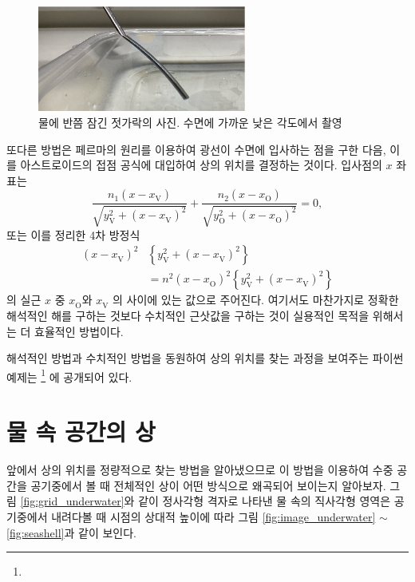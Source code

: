 \documentclass[twocolumn]{article}
\begin{document}
\begin{figure}[h]
	\centering
	\includegraphics[width=2.7in]{figs/img_1805_2.eps}
	\caption{물에 반쯤 잠긴 젓가락의 사진. 수면에 가까운 낮은 각도에서 촬영}
	\label{fig:picture}
\end{figure}


또다른 방법은 페르마의 원리를 이용하여 광선이 수면에 입사하는 점을 구한 다음, 이를 아스트로이드의 접점 공식에 대입하여 상의 위치를 결정하는 것이다.
입사점의 $x$ 좌표는
\[
\dfrac{n_1 \left( x - x_{\mathrm{V}}^{} \right)}{\sqrt{ y_{\mathrm{V}}^2 + \left( x - x_{\mathrm{V}}^{} \right)^2 }}
+\dfrac{n_2 \left( x - x_{\mathrm{O}}^{} \right)}{\sqrt{ y_{\mathrm{O}}^2 + \left( x - x_{\mathrm{O}}^{} \right)^2 }}
= 0,
\]
또는 이를 정리한 4차 방정식
\[ \begin{aligned}
\left( x - x_{\mathrm{V}}^{} \right)^2 & \left\{ y_{\mathrm{V}}^2 + \left(x - x_{\mathrm{V}}^{} \right)^2 \right\}\\
&= n^2 \left( x - x_{\mathrm{O}}^{} \right)^2 \left\{ y_{\mathrm{V}}^2 + \left(x - x_{\mathrm{V}}^{} \right)^2 \right\}
\end{aligned}
\]
의 실근 $x$ 중 $x_{\mathrm{O}}^{}$와 $x_{\mathrm{V}}^{}$ 의 사이에 있는 값으로 주어진다. 여기서도 마찬가지로 정확한 해석적인 해를 구하는 것보다 수치적인 근삿값을 구하는 것이 실용적인 목적을 위해서는 더 효율적인 방법이다.

해석적인 방법과 수치적인 방법을 동원하여 상의 위치를 찾는 과정을 보여주는 파이썬 예제는  
\href{https://github.com/mingshey/python_projects/blob/main/Refraction_Image.ipynb}%
{}\footnote{} 에 공개되어 있다.

\section{물 속 공간의 상}
앞에서 상의 위치를 정량적으로 찾는 방법을 알아냈으므로 이 방법을 이용하여 
수중 공간을 공기중에서 볼 때 전체적인 상이 어떤 방식으로 왜곡되어 보이는지  알아보자. 
그림 \ref{fig:grid_underwater}와 같이 정사각형 격자로 나타낸 물 속의 직사각형 영역은 공기중에서 내려다볼 때
시점의 상대적 높이에 따라 그림 \ref{fig:image_underwater} $\sim$ \ref{fig:seashell}과 같이 보인다.
\end{document}
